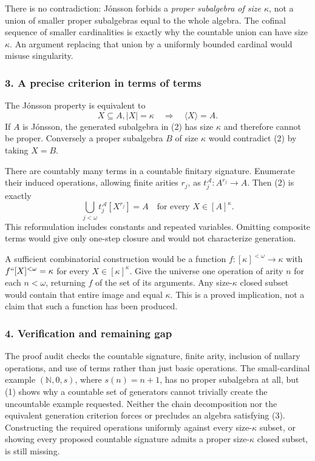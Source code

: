 \documentclass[11pt,a4paper]{article}
\begin{document}
There is no contradiction: Jónsson forbids a \emph{proper subalgebra of size $\kappa$}, not a union of smaller proper subalgebras equal to the whole algebra. The cofinal sequence of smaller cardinalities is exactly why the countable union can have size $\kappa$. An argument replacing that union by a uniformly bounded cardinal would misuse singularity.

\subsubsection{3. A precise criterion in terms of terms}
The Jónsson property is equivalent to
\[X\subseteq A, |X|=\kappa\quad\Longrightarrow\quad\langle X\rangle=A.\tag{2}\]
If $A$ is Jónsson, the generated subalgebra in (2) has size $\kappa$ and therefore cannot be proper. Conversely a proper subalgebra $B$ of size $\kappa$ would contradict (2) by taking $X=B$.

There are countably many terms in a countable finitary signature. Enumerate their induced operations, allowing finite arities $r_j$, as $t_j^\mathcal A:A^{r_j}\to A$. Then (2) is exactly
\[\bigcup_{j<\omega}t_j^\mathcal A[X^{r_j}]=A
\quad\text{for every }X\in[A]^\kappa.\tag{3}\]
This reformulation includes constants and repeated variables. Omitting composite terms would give only one-step closure and would not characterize generation.

A sufficient combinatorial construction would be a function $f:[\kappa]^{<\omega}\to\kappa$ with $f``[X]^{<\omega}=\kappa$ for every $X\in[\kappa]^\kappa$. Give the universe one operation of arity $n$ for each $n<\omega$, returning $f$ of the set of its arguments. Any size-$\kappa$ closed subset would contain that entire image and equal $\kappa$. This is a proved implication, not a claim that such a function has been produced.

\subsubsection{4. Verification and remaining gap}
The proof audit checks the countable signature, finite arity, inclusion of nullary operations, and use of terms rather than just basic operations. The small-cardinal example $(\mathbb N,0,s)$, where $s(n)=n+1$, has no proper subalgebra at all, but (1) shows why a countable set of generators cannot trivially create the uncountable example requested. Neither the chain decomposition nor the equivalent generation criterion forces or precludes an algebra satisfying (3). Constructing the required operations uniformly against every size-$\kappa$ subset, or showing every proposed countable signature admits a proper size-$\kappa$ closed subset, is still missing.
\end{document}
